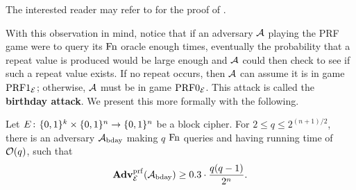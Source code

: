 The interested reader may refer to \cite{BellareRogawayBook} for the proof of .
 
With this observation in mind, notice that if an adversary ${\mathcal A}$ playing the PRF game were to query its $\textnormal{Fn}$ oracle enough times, eventually the probability that a repeat value is produced would be large enough and ${\mathcal A}$ could then check to see if such a repeat value exists. If no repeat occurs, then ${\mathcal A}$ can assume it is in game $\textnormal{PRF}1_{{\cal E}}$; otherwise, ${\mathcal A}$ must be in game $\textnormal{PRF}0_{{\cal E}}$. This attack is called the \textbf{birthday attack}. We present this more formally with the following.

\begin{clm}
	\label{clm:bday}
	Let $E{{\kern .05em}\colon{\kern .05em}}\{0,1\}^k \times \{0,1\}^n \to \{0,1\}^n$ be a block cipher. For $2 \leq q \leq 2^{(n+1)/2}$, there is an adversary ${\mathcal A}_\text{bday}$ making $q$ $\textnormal{Fn}$ queries and having running time of ${\cal O}(q)$, such that
	\begin{equation*}
		\mathbf{Adv}^{\mathrm{prf}}_{{\cal E}}({\mathcal A}_\text{bday}) \geq 0.3 \cdot \frac{q(q-1)}{2^n}.
	\end{equation*}
\end{clm} 

